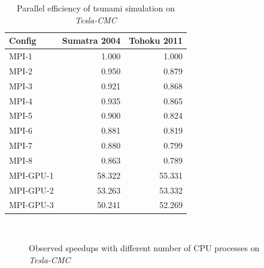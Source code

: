 \documentclass{usiinftr}
\begin{document}
\begin{table}
\begin{center}
\begin{tabular}{|l||r|r|} \hline
{\bf Config} & {\bf Sumatra 2004} & {\bf Tohoku 2011} \\ \hline\hline
MPI-1 & 1.000 & 1.000 \\ \hline
MPI-2 & 0.950 & 0.879 \\ \hline
MPI-3 & 0.921 & 0.868 \\ \hline
MPI-4 & 0.935 & 0.865 \\ \hline
MPI-5 & 0.900 & 0.824 \\ \hline
MPI-6 & 0.881 & 0.819 \\ \hline
MPI-7 & 0.880 & 0.799 \\ \hline
MPI-8 & 0.863 & 0.789 \\ \hline
MPI-GPU-1 & 58.322 & 55.331 \\ \hline
MPI-GPU-2 & 53.263 & 53.332 \\ \hline
MPI-GPU-3 & 50.241 & 52.269 \\ \hline
\end{tabular}
\end{center}
\caption{Parallel efficiency of tsunami simulation on \emph{Tesla-CMC} \label{tab:efficiency}}
\end{table}

\begin{figure}
\centering
\mbox{
}
\quad
\mbox{
}
\caption{Observed speedups with different number of CPU processes on \emph{Tesla-CMC}}
\label{fig:mpi_speedup}
\end{figure}
\end{document}
